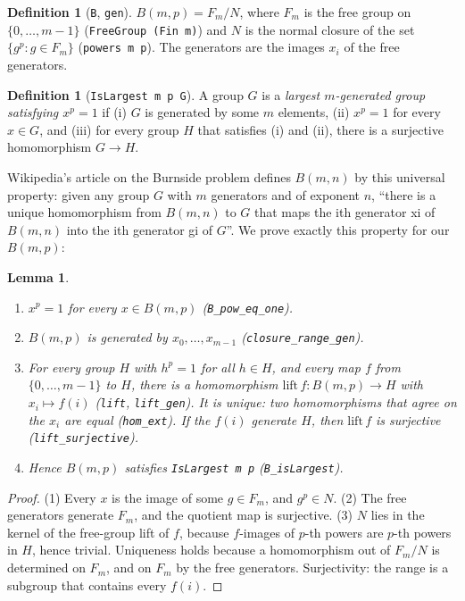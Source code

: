 \documentclass[11pt]{article}
\newtheorem{lemma}[theorem]{Lemma}
\theoremstyle{definition}
\newtheorem{definition}[theorem]{Definition}
\theoremstyle{remark}
\begin{document}
\begin{definition}[\texttt{B}, \texttt{gen}]
$B(m,p)=F_m/N$, where $F_m$ is the free group on $\{0,\dots,m-1\}$ (\texttt{FreeGroup (Fin m)}) and
$N$ is the normal closure of the set $\{g^p : g\in F_m\}$ (\texttt{powers m p}). The generators are
the images $x_i$ of the free generators.
\end{definition}

\begin{definition}[\texttt{IsLargest m p G}]
A group $G$ is a \emph{largest $m$-generated group satisfying $x^p=1$} if (i) $G$ is generated by
some $m$ elements, (ii) $x^p=1$ for every $x\in G$, and (iii) for every group $H$ that satisfies (i)
and (ii), there is a surjective homomorphism $G\to H$.
\end{definition}

Wikipedia's article on the Burnside problem defines $B(m,n)$ by this universal property: given
any group $G$ with $m$ generators and of exponent $n$, ``there is a unique homomorphism from
$B(m, n)$ to $G$ that maps the ith generator xi of $B(m, n)$ into the ith generator gi of $G$''.
We prove exactly this property for our $B(m,p)$:

\begin{lemma}\label{lem:univ}
\begin{enumerate}
\item $x^p=1$ for every $x\in B(m,p)$ (\texttt{B\_pow\_eq\_one}).
\item $B(m,p)$ is generated by $x_0,\dots,x_{m-1}$ (\texttt{closure\_range\_gen}).
\item For every group $H$ with $h^p=1$ for all $h\in H$, and every map $f$ from
  $\{0,\dots,m-1\}$ to $H$, there is a homomorphism $\mathrm{lift}\,f:B(m,p)\to H$ with
  $x_i\mapsto f(i)$ (\texttt{lift}, \texttt{lift\_gen}). It is unique: two homomorphisms that agree
  on the $x_i$ are equal (\texttt{hom\_ext}). If the $f(i)$ generate $H$, then $\mathrm{lift}\,f$ is
  surjective (\texttt{lift\_surjective}).
\item Hence $B(m,p)$ satisfies \texttt{IsLargest m p} (\texttt{B\_isLargest}).
\end{enumerate}
\end{lemma}

\begin{proof}
(1) Every $x$ is the image of some $g\in F_m$, and $g^p\in N$. (2) The free generators generate
$F_m$, and the quotient map is surjective. (3) $N$ lies in the kernel of the free-group lift of
$f$, because $f$-images of $p$-th powers are $p$-th powers in $H$, hence trivial. Uniqueness holds
because a homomorphism out of $F_m/N$ is determined on $F_m$, and on $F_m$ by the free generators.
Surjectivity: the range is a subgroup that contains every $f(i)$.
\end{proof}
\end{document}
